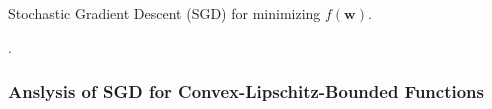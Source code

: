 \begin{algorithm}[h!]
	\caption{Stochastic Gradient Descent (SGD) for minimizing $ f(\mathbf{w}) $.}
	\begin{algorithmic}
		\EndFor.
		\State{}
	\end{algorithmic}
\end{algorithm}

\subsubsection{Anslysis of SGD for Convex-Lipschitz-Bounded Functions}

